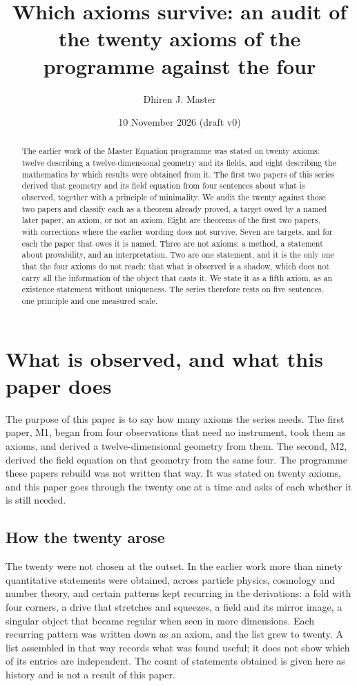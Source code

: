 \documentclass[11pt,a4paper]{article}
\title{Which axioms survive: an audit of the twenty axioms of the programme against the four}
\author{Dhiren J. Master}
\date{10 November 2026 (draft v0)}
\theoremstyle{plain}
\theoremstyle{definition}
\theoremstyle{remark}
\begin{document}
\maketitle

\begin{abstract}
The earlier work of the Master Equation programme was stated on twenty axioms: twelve describing a twelve-dimensional geometry and its fields, and eight describing the mathematics by which results were obtained from it. The first two papers of this series derived that geometry and its field equation from four sentences about what is observed, together with a principle of minimality. We audit the twenty against those two papers and classify each as a theorem already proved, a target owed by a named later paper, an axiom, or not an axiom. Eight are theorems of the first two papers, with corrections where the earlier wording does not survive. Seven are targets, and for each the paper that owes it is named. Three are not axioms: a method, a statement about provability, and an interpretation. Two are one statement, and it is the only one that the four axioms do not reach: that what is observed is a shadow, which does not carry all the information of the object that casts it. We state it as a fifth axiom, as an existence statement without uniqueness. The series therefore rests on five sentences, one principle and one measured scale.
\end{abstract}

\section{What is observed, and what this paper does}\label{sec:intro}

The purpose of this paper is to say how many axioms the series needs. The first paper, M1, began from four observations that need no instrument, took them as axioms, and derived a twelve-dimensional geometry from them. The second, M2, derived the field equation on that geometry from the same four. The programme these papers rebuild was not written that way. It was stated on twenty axioms, and this paper goes through the twenty one at a time and asks of each whether it is still needed.

\subsection{How the twenty arose}\label{sec:history}

The twenty were not chosen at the outset. In the earlier work more than ninety quantitative statements were obtained, across particle physics, cosmology and number theory, and certain patterns kept recurring in the derivations: a fold with four corners, a drive that stretches and squeezes, a field and its mirror image, a singular object that became regular when seen in more dimensions. Each recurring pattern was written down as an axiom, and the list grew to twenty. A list assembled in that way records what was found useful; it does not show which of its entries are independent. The count of statements obtained is given here as history and is not a result of this paper.
\end{document}

